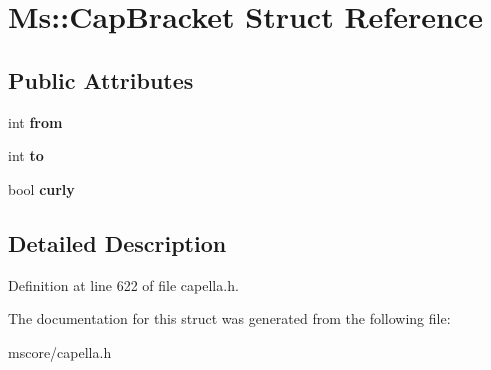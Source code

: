 \hypertarget{struct_ms_1_1_cap_bracket}{}\section{Ms\+:\+:Cap\+Bracket Struct Reference}
\label{struct_ms_1_1_cap_bracket}
\subsection*{Public Attributes}
\begin{DoxyCompactItemize}
\item 
\mbox{\label{struct_ms_1_1_cap_bracket_a1bbd3e94a2af301ebf446bf34376c7c5}} 
int {\bfseries from}
\item 
\mbox{\label{struct_ms_1_1_cap_bracket_a95e24f08d6113b07a6b3463f99bff718}} 
int {\bfseries to}
\item 
\mbox{\label{struct_ms_1_1_cap_bracket_aec1a5e7aa9b69a00c22d41182786c8b9}} 
bool {\bfseries curly}
\end{DoxyCompactItemize}


\subsection{Detailed Description}


Definition at line 622 of file capella.\+h.



The documentation for this struct was generated from the following file\+:\begin{DoxyCompactItemize}
\item 
mscore/capella.\+h\end{DoxyCompactItemize}
